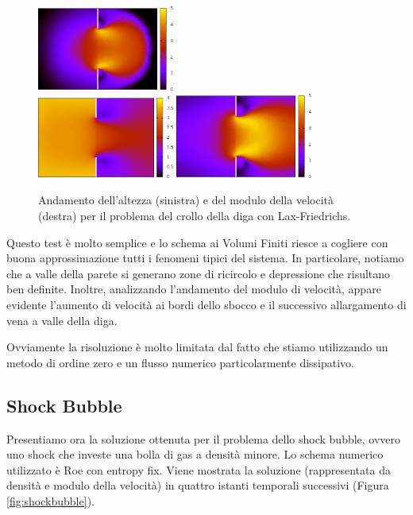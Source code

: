 \begin{figure}[htbp]
\includegraphics[width=0.4\textwidth]{images/DamBreak/velocity-solution0500.png}  \\[0.5cm]
\includegraphics[width=0.4\textwidth]{images/DamBreak/height-solution0900.png}  \hspace{0.2cm}
\includegraphics[width=0.4\textwidth]{images/DamBreak/velocity-solution0900.png}
\caption{Andamento dell'altezza (sinistra) e del modulo della velocità (destra) per il problema del crollo della diga con Lax-Friedrichs.}
\label{fig:dambreak}
\end{figure}

Questo test è molto semplice e lo schema ai Volumi Finiti riesce a cogliere con buona approssimazione tutti i fenomeni tipici del sistema. In particolare, notiamo che a valle della parete si generano zone di ricircolo e depressione che risultano ben definite. Inoltre, analizzando l'andamento del modulo di velocità, appare evidente l'aumento di velocità ai bordi dello sbocco e il successivo allargamento di vena a valle della diga.

Ovviamente la risoluzione è molto limitata dal fatto che stiamo utilizzando un metodo di ordine zero e un flusso numerico particolarmente dissipativo.

\subsection{Shock Bubble}
Presentiamo ora la soluzione ottenuta per il problema dello shock bubble, ovvero uno shock che investe una bolla di gas a densità minore. Lo schema numerico utilizzato è Roe con entropy fix. Viene mostrata la soluzione (rappresentata da densità e modulo della velocità) in quattro istanti temporali successivi (Figura \ref{fig:shockbubble}).
 
